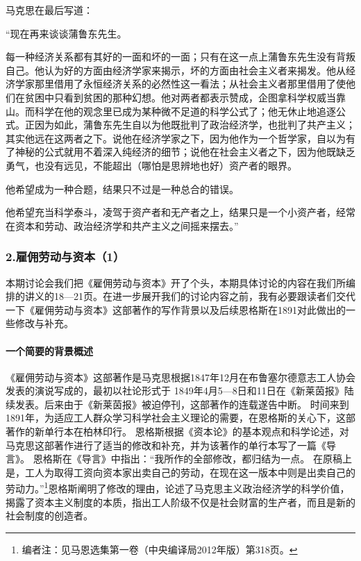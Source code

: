 \documentclass[a4paper,twoside,12pt,AutoFakeBold]{ctexart}
\begin{document}
马克思在最后写道：
\begin{adjustwidth}{2em}{2em}
    \qquad\fangsong
    “现在再来谈谈蒲鲁东先生。

每一种经济关系都有其好的一面和坏的一面；只有在这一点上蒲鲁东先生没有背叛自己。他认为好的方面由经济学家来揭示，坏的方面由社会主义者来揭发。他从经济学家那里借用了永恒经济关系的必然性这一看法；从社会主义者那里借用了使他们在贫困中只看到贫困的那种幻想。他对两者都表示赞成，企图拿科学权威当靠山。而科学在他的观念里已成为某种微不足道的科学公式了；他无休止地追逐公式。正因为如此，蒲鲁东先生自以为他既批判了政治经济学，也批判了共产主义；其实他远在这两者之下。说他在经济学家之下，因为他作为一个哲学家，自以为有了神秘的公式就用不着深入纯经济的细节；说他在社会主义者之下，因为他既缺乏勇气，也没有远见，不能超出（哪怕是思辨地也好）资产者的眼界。

他希望成为一种合题，结果只不过是一种总合的错误。

他希望充当科学泰斗，凌驾于资产者和无产者之上，结果只是一个小资产者，经常在资本和劳动、政治经济学和共产主义之间摇来摆去。”
\end{adjustwidth}

\subsubsection{2.雇佣劳动与资本（1）}
本期讨论会我们把《雇佣劳动与资本》开了个头，本期具体讨论的内容在我们所编排的讲义的18—21页。在进一步展开我们的讨论内容之前，我有必要跟读者们交代一下《雇佣劳动与资本》这部著作的写作背景以及后续恩格斯在1891对此做出的一些修改与补充。

\paragraph{一个简要的背景概述}\begin{fangsong}
《雇佣劳动与资本》这部著作是马克思根据1847年12月在布鲁塞尔德意志工人协会发表的演说写成的，最初以社论形式于 1849年4月5—8日和11日在《新莱茵报》陆续发表。后来由于《新莱茵报》被迫停刊，这部著作的连载遂告中断。 
时间来到1891年，为适应工人群众学习科学社会主义理论的需要，在恩格斯的关心下，这部著作的新单行本在柏林印行。 恩格斯根据《资本论》的基本观点和科学论述，对马克思这部著作进行了适当的修改和补充，并为该著作的单行本写了一篇《导言》。 恩格斯在《导言》中指出：“我所作的全部修改，都归结为一点。 在原稿上是，工人为取得工资向资本家出卖自己的劳动，在现在这一版本中则是出卖自己的劳动力。”\footnote{编者注：见马恩选集第一卷（中央编译局2012年版）第318页。}恩格斯阐明了修改的理由，论述了马克思主义政治经济学的科学价值，揭露了资本主义制度的本质，指出工人阶级不仅是社会财富的生产者，而且是新的社会制度的创造者。
\end{fangsong}
\end{document}
